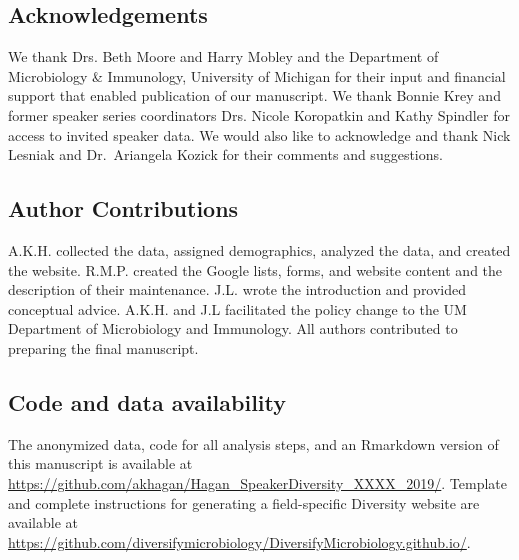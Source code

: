 \documentclass[10pt,]{article}
\begin{document}
\subsection{Acknowledgements}\label{acknowledgements}

We thank Drs. Beth Moore and Harry Mobley and the Department of
Microbiology \& Immunology, University of Michigan for their input and
financial support that enabled publication of our manuscript. We thank
Bonnie Krey and former speaker series coordinators Drs. Nicole
Koropatkin and Kathy Spindler for access to invited speaker data. We
would also like to acknowledge and thank Nick Lesniak and Dr.~Ariangela
Kozick for their comments and suggestions.

\subsection{Author Contributions}\label{author-contributions}

A.K.H. collected the data, assigned demographics, analyzed the data, and
created the website. R.M.P. created the Google lists, forms, and website
content and the description of their maintenance. J.L. wrote the
introduction and provided conceptual advice. A.K.H. and J.L facilitated
the policy change to the UM Department of Microbiology and Immunology.
All authors contributed to preparing the final manuscript.

\subsection{Code and data
availability}\label{code-and-data-availability}

The anonymized data, code for all analysis steps, and an Rmarkdown
version of this manuscript is available at
\url{https://github.com/akhagan/Hagan_SpeakerDiversity_XXXX_2019/}.
Template and complete instructions for generating a field-specific
Diversity website are available at
\url{https://github.com/diversifymicrobiology/DiversifyMicrobiology.github.io/}.

\newpage
\end{document}
